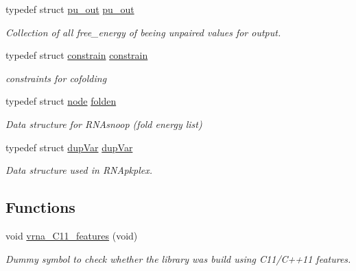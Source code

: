 \begin{DoxyCompactItemize}
\mbox{\label{group__data__structures_ga501763bd204b60f40e3ab68b40023023}} 
typedef struct \hyperlink{group__data__structures_structpu__out}{pu\+\_\+out} \hyperlink{group__data__structures_ga501763bd204b60f40e3ab68b40023023}{pu\+\_\+out}
\begin{DoxyCompactList}\small\item\em Collection of all free\+\_\+energy of beeing unpaired values for output. \end{DoxyCompactList}\item 
\mbox{\label{group__data__structures_ga212e3afb0cc299acdfb1ec976435686e}} 
typedef struct \hyperlink{group__data__structures_structconstrain}{constrain} \hyperlink{group__data__structures_ga212e3afb0cc299acdfb1ec976435686e}{constrain}
\begin{DoxyCompactList}\small\item\em constraints for cofolding \end{DoxyCompactList}\item 
\mbox{\label{group__data__structures_gaaf402058651c8218fa72788d591cda05}} 
typedef struct \hyperlink{group__data__structures_structnode}{node} \hyperlink{group__data__structures_gaaf402058651c8218fa72788d591cda05}{folden}
\begin{DoxyCompactList}\small\item\em Data structure for R\+N\+Asnoop (fold energy list) \end{DoxyCompactList}\item 
\mbox{\label{group__data__structures_gabd3b93f9aaa9f3acce2d148bae97d24e}} 
typedef struct \hyperlink{group__data__structures_structdupVar}{dup\+Var} \hyperlink{group__data__structures_gabd3b93f9aaa9f3acce2d148bae97d24e}{dup\+Var}
\begin{DoxyCompactList}\small\item\em Data structure used in R\+N\+Apkplex. \end{DoxyCompactList}\end{DoxyCompactItemize}
\subsection*{Functions}
\begin{DoxyCompactItemize}
\item 
void \hyperlink{group__data__structures_ga21744ae2d6a17309f9327d3547cef0cb}{vrna\+\_\+\+C11\+\_\+features} (void)
\begin{DoxyCompactList}\small\item\em Dummy symbol to check whether the library was build using C11/\+C++11 features. \end{DoxyCompactList}\end{DoxyCompactItemize}


